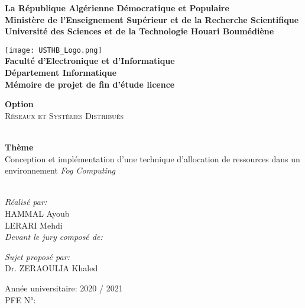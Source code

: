 \begin{titlepage}
\begin{center}

\textbf{
La République Algérienne Démocratique et Populaire\\[0.1cm]
Ministère de l'Enseignement Supérieur et de la Recherche Scientifique\\[0.1cm]
Université des Sciences et de la Technologie Houari Boumédiène\\[0.5cm]}

\texttt{[image: USTHB\_Logo.png]}\\[0.7cm]

{\Large \textbf{
Faculté d’Electronique et d’Informatique\\[0,1cm]
Département Informatique\\[0,1cm]
Mémoire de projet de fin d'étude licence\\[0.5cm]}}

{\Large \textbf{Option\\[0.5cm]}
\textsc{Réseaux et Systèmes Distribués\\}}

\HRule \\[0.4cm]
{\Huge 
{\bfseries Thème}\\
Conception et implémentation d'une
technique d'allocation de ressources
dans un environnement \emph{Fog Computing}\\[0.4cm]}
\HRule \\[0.7cm]

\normalsize
\begin{minipage}[t]{0.4\textwidth}
\begin{flushleft}
\large
\emph{Réalisé par:}\\
\textsc{HAMMAL} Ayoub\\
\textsc{LERARI} Mehdi\\[0.7cm]
\emph{Devant le jury composé de:}\\
\end{flushleft}
\end{minipage}
%
\begin{minipage}[t]{0.4\textwidth}
\begin{flushright} 
\large
\emph{Sujet proposé par:}\\
Dr. \textsc{ZERAOULIA} Khaled
\end{flushright}
\end{minipage}

\vfill

{\large Année universitaire: 2020 / 2021}\\
{\large PFE N°: }

\end{center}
\end{titlepage}

